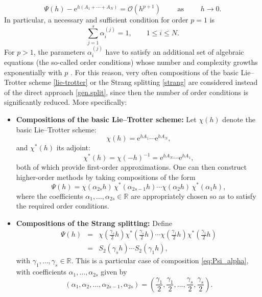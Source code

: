 \documentclass[11pt]{article}
\newcommand{\e}{\ensuremath{\mathrm{e}}}
\begin{document}
\begin{equation} \label{diff1}
     \Psi(h) - \e^{h (A_1 + \cdots +A_N)} = \mathcal{O}(h^{p+1}) \qquad \mbox{ as } \qquad h \rightarrow 0.
\end{equation}
 In particular, a necessary and sufficient condition for order $p= 1$ is
\begin{equation}
\label{eq:consistency}
	\sum_{j=1}^s \alpha_i^{(j)}=1, \qquad 1 \leq i \leq N.
\end{equation}
For $p>1$, the parameters $ \alpha_i^{(j)}$ have to satisfy an additional set of algebraic equations (the so-called order conditions) whose
number and complexity growths exponentially with $p$ \cite{blanes24smf}. For this reason, very often 
compositions of the basic Lie--Trotter scheme \eqref{lie-trotter} or the Strang splitting \eqref{strang} are considered instead of the direct approach \eqref{gen.split}, since
then the number of order conditions is significantly reduced.  More specifically:

\begin{itemize}
\item \textbf{Compositions of the basic Lie--Trotter scheme:}  
Let $\chi(h)$ denote the basic Lie--Trotter scheme:
\begin{equation}
\label{eq:chi}
\chi(h) = \mathrm{e}^{h A_1} \cdots \mathrm{e}^{h A_N},
\end{equation}
and $\chi^*(h)$ its adjoint:
\begin{equation}
\label{eq:chi*}
 \chi^*(h) = \chi(-h)^{-1} = \mathrm{e}^{h A_N} \cdots \mathrm{e}^{h A_1},
\end{equation}
%
both of which provide first-order approximations. One can then construct higher-order methods by taking compositions of the form
\begin{equation} \label{eq:Psi_alpha}
 \Psi(h) = \chi(\alpha_{2s} h) \, \chi^*(\alpha_{2s-1} h) \cdots \chi(\alpha_2 h) \, \chi^*(\alpha_1 h),
\end{equation}
where the coefficients $\alpha_1, \ldots, \alpha_{2s} \in \mathbb{R}$ are appropriately chosen so as to satisfy the required order conditions.

\item \textbf{Compositions of the Strang splitting:}  
Define
\begin{eqnarray} \label{eq:comp_Strang}
  \Psi(h) & =  &\chi\left(\frac{\gamma_s}{2} h\right) \chi^*\left(\frac{\gamma_s}{2} h\right) \cdots \chi\left(\frac{\gamma_1}{2} h\right) \chi^*\left(\frac{\gamma_1}{2} h\right)\nonumber \\
     & = & S_2(\gamma_s h) \cdots S_2(\gamma_1 h),
\end{eqnarray}
with $\gamma_1, \ldots, \gamma_s \in \mathbb{R}$.  
This is a particular case of composition \eqref{eq:Psi_alpha}, with coefficients $\alpha_1, \ldots, \alpha_{2s}$  given by
\[
   (\alpha_1, \alpha_2, \ldots, \alpha_{2s-1}, \alpha_{2s}) = \left( \frac{\gamma_1}{2}, \frac{\gamma_1}{2}, \ldots, \frac{\gamma_s}{2}, \frac{\gamma_s}{2} \right).
\]
\end{itemize}
\end{document}
